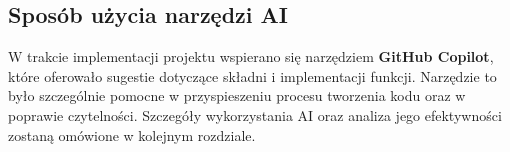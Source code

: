 \subsection{Sposób użycia narzędzi AI}
W trakcie implementacji projektu wspierano się narzędziem \textbf{GitHub Copilot}, które oferowało sugestie dotyczące składni i implementacji funkcji. Narzędzie to było szczególnie pomocne w przyspieszeniu procesu tworzenia kodu oraz w poprawie czytelności. Szczegóły wykorzystania AI oraz analiza jego efektywności zostaną omówione w kolejnym rozdziale.

